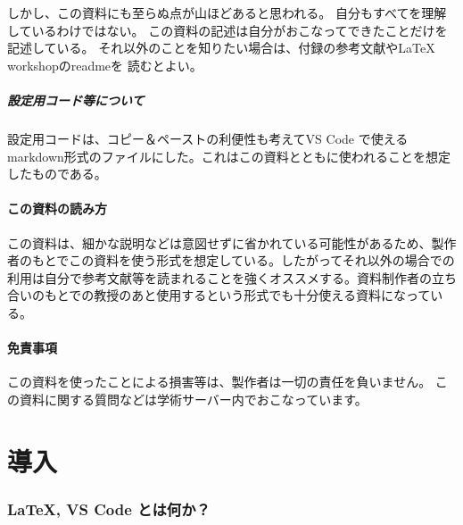 \documentclass{ltjsarticle}
\begin{document}
しかし、この資料にも至らぬ点が山ほどあると思われる。
自分もすべてを理解しているわけではない。
この資料の記述は自分がおこなってできたことだけを記述している。
それ以外のことを知りたい場合は、付録の参考文献やLaTeX workshopのreadmeを
読むとよい。

\subsubsection{設定用コード等について}
設定用コードは、コピー＆ペーストの利便性も考えてVS Code で使えるmarkdown形式のファイルにした。これはこの資料とともに使われることを想定したものである。


\subsection{この資料の読み方}
この資料は、細かな説明などは意図せずに省かれている可能性があるため、製作者のもとでこの資料を使う形式を想定している。したがってそれ以外の場合での利用は自分で参考文献等を読まれることを強くオススメする。資料制作者の立ち合いのもとでの教授のあと使用するという形式でも十分使える資料になっている。

\subsection{免責事項}
この資料を使ったことによる損害等は、製作者は一切の責任を負いません。
この資料に関する質問などは学術サーバー内でおこなっています。

\tableofcontents
\clearpage

\part{導入}
\section{\LaTeX , VS Code とは何か？}
\end{document}
